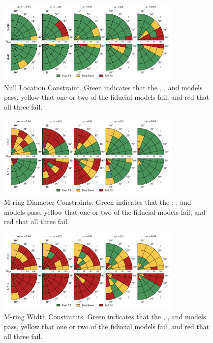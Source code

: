 \begin{figure}
  \centering
  \includegraphics[width=0.8\textwidth]{./figures/Null_loc_Constraints.pdf}
  \caption{Null Location Constraint.  Green indicates that the \kharma, \bhac, and \hamr models pass, yellow that one or two of the fiducial models fail, and red that all three fail.}
  \label{fig:null_pizza}
\end{figure}

\begin{figure}
  \centering
  \includegraphics[width=0.8\textwidth]{./figures/Mring_d_Constraints.pdf}
  \caption{M-ring Diameter Constraints.  Green indicates that the \kharma, \bhac, and \hamr models pass, yellow that one or two of the fiducial models fail, and red that all three fail.}
  \label{fig:mring_diam_pizza}
\end{figure}

\begin{figure}
  \centering
  \includegraphics[width=0.8\textwidth]{./figures/Mring_w_Constraints.pdf}
  \caption{M-ring Width Constraints.  Green indicates that the \kharma, \bhac, and \hamr models pass, yellow that one or two of the fiducial models fail, and red that all three fail.}
  \label{fig:mring_width_pizza}
\end{figure}

